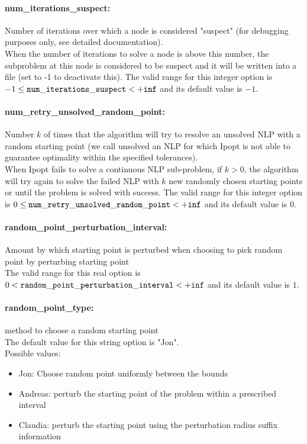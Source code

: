 \paragraph{num\_iterations\_suspect:}\label{opt:num_iterations_suspect} Number of iterations over which a node is considered "suspect" (for debugging purposes only, see detailed documentation). \\
 When the number of iterations to solve a node is above this number, the subproblem at this node is considered to be suspect and it will be written into a file (set to -1 to deactivate this). The valid range for this integer option is
$-1 \le {\tt num\_iterations\_suspect } <  {\tt +inf}$
and its default value is $-1$.


\paragraph{num\_retry\_unsolved\_random\_point:}\label{opt:num_retry_unsolved_random_point} Number $k$ of times that the algorithm will try to resolve an unsolved NLP with a random starting point (we call unsolved an NLP for which Ipopt is not able to guarantee optimality within the specified tolerances). \\
 When Ipopt fails to solve a continuous NLP sub-problem, if $k > 0$, the algorithm will try again to solve the failed NLP with $k$ new randomly chosen starting points  or until the problem is solved with success. The valid range for this integer option is
$0 \le {\tt num\_retry\_unsolved\_random\_point } <  {\tt +inf}$
and its default value is $0$.


\paragraph{random\_point\_perturbation\_interval:}\label{opt:random_point_perturbation_interval} Amount by which starting point is perturbed when choosing to pick random point by perturbing starting point \\
 The valid range for this real option is 
$0 <  {\tt random\_point\_perturbation\_interval } <  {\tt +inf}$
and its default value is $1$.


\paragraph{random\_point\_type:}\label{opt:random_point_type} method to choose a random starting point \\
The default value for this string option is "Jon".
\\ 
Possible values:
\begin{itemize}
   \item Jon: Choose random point uniformly between the bounds
   \item Andreas: perturb the starting point of the problem within a prescribed interval
   \item Claudia: perturb the starting point using the perturbation radius suffix information
\end{itemize}

